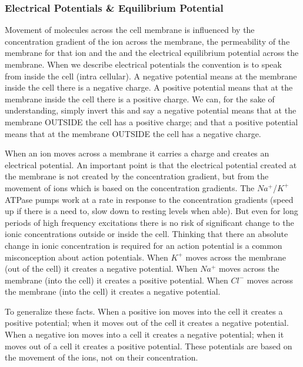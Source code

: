 \subsubsection{Electrical Potentials \& Equilibrium Potential}


Movement of molecules across the cell membrane is influenced by the concentration gradient of the ion across the membrane, the permeability of the membrane for that ion and the and the electrical equilibrium potential across the membrane. When we describe electrical potentials the convention is to speak from inside the cell (intra cellular). A negative potential means at the membrane inside the cell there is a negative charge. A positive potential means that at the membrane inside the cell there is a positive charge. We can, for the sake of understanding, simply invert this and say a negative potential means that at the membrane OUTSIDE the cell has a positive charge; and that a positive potential means that at the membrane OUTSIDE the cell has a negative charge.

When an ion moves across a membrane it carries a charge and creates an electrical potential. An important point is that the electrical potential created at the membrane is not created by the concentration gradient, but from the movement of ions which is based on the concentration gradients.  The $Na^+$/$K^+$ ATPase pumps work at a rate in response to the concentration gradients (speed up if there is a need to, slow down to resting levels when able). But even for long periods of high frequency excitations there is no risk of significant change to the ionic concentrations outside or inside the cell. Thinking that there an absolute change in ionic concentration is required for an action potential is a common misconception about action potentials\cite{silverthorn_uncovering_2002}. When $K^+$ moves across the membrane (out of the cell) it creates a negative potential. When $Na^+$ moves across the membrane (into the cell) it creates a positive potential. When $Cl^-$ moves across the membrane (into the cell) it creates a negative potential. 

To generalize these facts. When a positive ion moves into the cell it creates a positive potential; when it moves out of the cell it creates a negative potential. When a negative ion moves into a cell it creates a negative potential; when it moves out of a cell it creates a positive potential. These potentials are based on the movement of the ions, not on their concentration. 

